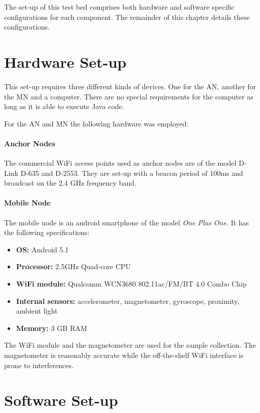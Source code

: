 The set-up of this test bed comprises both hardware and software specific configurations for each component. The remainder of this chapter details these configurations.

\section{Hardware Set-up}

This set-up requires three different kinds of devices. One for the AN, another for the MN and a computer. There are no special requirements for the computer as long as it is able to execute Java code.

For the AN and MN the following hardware was employed:

\paragraph{Anchor Nodes}
The commercial WiFi access points used as anchor nodes are of the model D-Link D-635 and D-2553. They are set-up with a beacon period of 100ms and broadcast on the 2.4 GHz frequency band.

\paragraph{Mobile Node}

The mobile node is an android smartphone of the model \emph{One Plus One}. It has the following specifications:

\begin{itemize}
\item \textbf{OS:} Android 5.1
\item \textbf{Processor:} 2.5GHz Quad-core CPU
\item \textbf{WiFi module:} Qualcomm WCN3680 802.11ac/FM/BT 4.0 Combo Chip
\item \textbf{Internal sensors:} accelerometer, magnetometer, gyroscope, proximity, ambient light
\item \textbf{Memory:} 3 GB RAM
\end{itemize}

The WiFi module and the magnetometer are used for the sample collection. The magnetometer is reasonably accurate while the off-the-shelf WiFi interface is  prone to interferences.


\section{Software Set-up}

